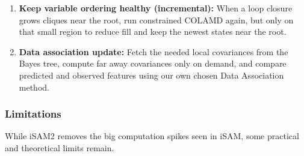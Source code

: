 \begin{enumerate}
    \item \textbf{Keep variable ordering healthy (incremental):} When a loop closure grows cliques near the root, run constrained COLAMD again, but only on that small region to reduce fill and keep the newest states near the root.
    
    \item \textbf{Data association update:} Fetch the needed local covariances from the Bayes tree, compute far away covariances only on demand, and compare predicted and observed features using our own chosen Data Association method.
\end{enumerate}



\subsubsection{Limitations}
While iSAM2 removes the big computation spikes seen in iSAM, some practical and theoretical limits remain.

